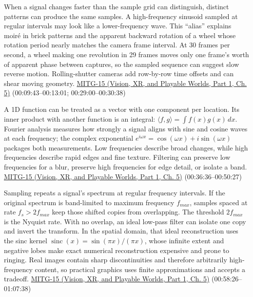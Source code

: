 When a signal changes faster than the sample grid can distinguish, distinct patterns can produce the same samples. A high-frequency sinusoid sampled at regular intervals may look like a lower-frequency wave. This ``alias'' explains moiré in brick patterns and the apparent backward rotation of a wheel whose rotation period nearly matches the camera frame interval. At 30 frames per second, a wheel making one revolution in 29 frames moves only one frame's worth of apparent phase between captures, so the sampled sequence can suggest slow reverse motion. Rolling-shutter cameras add row-by-row time offsets and can shear moving geometry. \href{../07-Vision-XR-and-Playable-Worlds-P01/main.pdf\#nameddest=04-visual-computing-ii-ch036-mitg-15---antialiasing}{MITG-15 (Vision, XR, and Playable Worlds, Part 1, Ch. 5)} (00:09:43--00:13:01; 00:29:00--00:30:38)

A 1D function can be treated as a vector with one component per location. Its inner product with another function is an integral: \(\langle f,g\rangle=\int f(x)g(x)\,dx\). Fourier analysis measures how strongly a signal aligns with sine and cosine waves at each frequency; the complex exponential \(e^{i\omega x}=\cos(\omega x)+i\sin(\omega x)\) packages both measurements. Low frequencies describe broad changes, while high frequencies describe rapid edges and fine texture. Filtering can preserve low frequencies for a blur, preserve high frequencies for edge detail, or isolate a band. \href{../07-Vision-XR-and-Playable-Worlds-P01/main.pdf\#nameddest=04-visual-computing-ii-ch036-mitg-15---antialiasing}{MITG-15 (Vision, XR, and Playable Worlds, Part 1, Ch. 5)} (00:36:36--00:50:27)

Sampling repeats a signal's spectrum at regular frequency intervals. If the original spectrum is band-limited to maximum frequency \(f_{max}\), samples spaced at rate \(f_s>2f_{max}\) keep those shifted copies from overlapping. The threshold \(2f_{max}\) is the Nyquist rate. With no overlap, an ideal low-pass filter can isolate one copy and invert the transform. In the spatial domain, that ideal reconstruction uses the sinc kernel \(\operatorname{sinc}(x)=\sin(\pi x)/(\pi x)\), whose infinite extent and negative lobes make exact numerical reconstruction expensive and prone to ringing. Real images contain sharp discontinuities and therefore arbitrarily high-frequency content, so practical graphics uses finite approximations and accepts a tradeoff. \href{../07-Vision-XR-and-Playable-Worlds-P01/main.pdf\#nameddest=04-visual-computing-ii-ch036-mitg-15---antialiasing}{MITG-15 (Vision, XR, and Playable Worlds, Part 1, Ch. 5)} (00:58:26--01:07:38)

